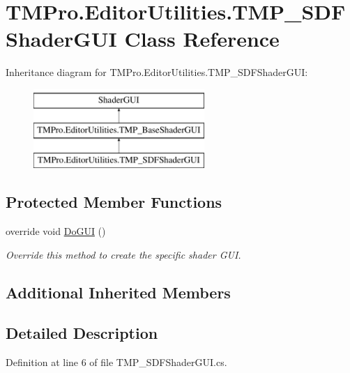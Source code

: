 \hypertarget{class_t_m_pro_1_1_editor_utilities_1_1_t_m_p___s_d_f_shader_g_u_i}{}\section{T\+M\+Pro.\+Editor\+Utilities.\+T\+M\+P\+\_\+\+S\+D\+F\+Shader\+G\+UI Class Reference}
\label{class_t_m_pro_1_1_editor_utilities_1_1_t_m_p___s_d_f_shader_g_u_i}
Inheritance diagram for T\+M\+Pro.\+Editor\+Utilities.\+T\+M\+P\+\_\+\+S\+D\+F\+Shader\+G\+UI\+:\begin{figure}[H]
\begin{center}
\leavevmode
\includegraphics[height=3.000000cm]{class_t_m_pro_1_1_editor_utilities_1_1_t_m_p___s_d_f_shader_g_u_i}
\end{center}
\end{figure}
\subsection*{Protected Member Functions}
\begin{DoxyCompactItemize}
\item 
override void \mbox{\hyperlink{class_t_m_pro_1_1_editor_utilities_1_1_t_m_p___s_d_f_shader_g_u_i_ad54675b667fc314961cedb1beeacd6b4}{Do\+G\+UI}} ()
\begin{DoxyCompactList}\small\item\em Override this method to create the specific shader G\+UI. \end{DoxyCompactList}\end{DoxyCompactItemize}
\subsection*{Additional Inherited Members}


\subsection{Detailed Description}


Definition at line 6 of file T\+M\+P\+\_\+\+S\+D\+F\+Shader\+G\+U\+I.\+cs.



